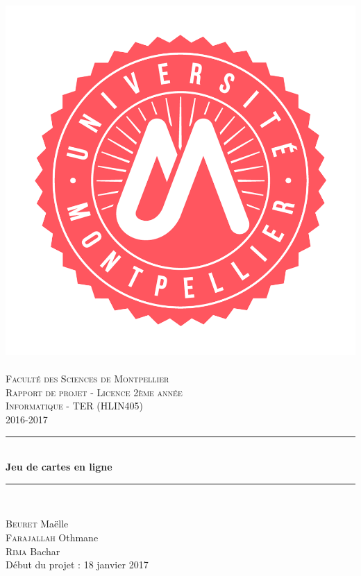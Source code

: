 \documentclass[12pt]{report}
\date{April 2017}
\newcommand{\HRule}{\rule{\linewidth}{0.5mm}}
\begin{document}
	\begin{titlepage}

		\begin{center}

			\includegraphics[scale=0.11]{images/logo-um.png}~\\[1.5cm]
			\textsc{\Large Faculté des Sciences de Montpellier}\\[2cm]
			\textsc{\Large Rapport de projet - Licence 2ème année}\\[0.5cm]
			\textsc{\Large Informatique - TER (HLIN405)}\\[0.5cm]
			\textsc{\Large 2016-2017}\\[1.5cm]

			\HRule \\[0.4cm]
			{ \huge \bfseries Jeu de cartes en ligne\\[0.4cm] }

			\HRule \\[2cm]

			\begin{flushleft}
				\large	\textsc{Beuret} Maëlle\\[0.5cm]
				\large	\textsc{Farajallah} Othmane\\[0.5cm]
				\large	\textsc{Rima} Bachar\\[0.5cm]
				Début du projet : 18 janvier 2017
			\end{flushleft}


\end{center}
\end{titlepage}
\end{document}
